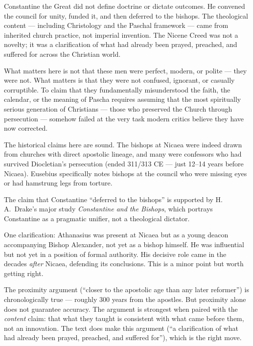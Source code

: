 \documentclass[10pt,twoside,openany]{book}
\begin{document}
Constantine the Great did not define doctrine or dictate outcomes. He
convened the council for unity, funded it, and then deferred to the
bishops. The theological content --- including Christology and the
Paschal framework --- came from inherited church practice, not imperial
invention. The Nicene Creed was not a novelty; it was a clarification
of what had already been prayed, preached, and suffered for across the
Christian world.

What matters here is not that these men were perfect, modern, or
polite --- they were not. What matters is that they were not confused,
ignorant, or casually corruptible. To claim that they fundamentally
misunderstood the faith, the calendar, or the meaning of Pascha
requires assuming that the most spiritually serious generation of
Christians --- those who preserved the Church through persecution ---
somehow failed at the very task modern critics believe they have now
corrected.

\begin{reviewerbox}
The historical claims here are sound. The bishops at
Nicaea were indeed drawn from churches with direct
apostolic lineage, and many were confessors who had
survived Diocletian's persecution (ended 311/313 CE ---
just 12--14 years before Nicaea). Eusebius specifically
notes bishops at the council who were missing eyes or
had hamstrung legs from torture.

The claim that Constantine ``deferred to the bishops''
is supported by H.\,A.\ Drake's major study \emph{Constantine
and the Bishops}, which portrays Constantine as a
pragmatic unifier, not a theological dictator.

One clarification: Athanasius was present at Nicaea but
as a young deacon accompanying Bishop Alexander, not
yet as a bishop himself. He was influential but not yet
in a position of formal authority. His decisive role
came in the decades \emph{after} Nicaea, defending its
conclusions. This is a minor point but worth getting
right.

The proximity argument (``closer to the apostolic age
than any later reformer'') is chronologically true ---
roughly 300 years from the apostles. But proximity
alone does not guarantee accuracy. The argument is
strongest when paired with the \emph{content} claim: that
what they taught is consistent with what came before
them, not an innovation. The text does make this
argument (``a clarification of what had already been
prayed, preached, and suffered for''), which is the
right move.
\end{reviewerbox}
\end{document}
